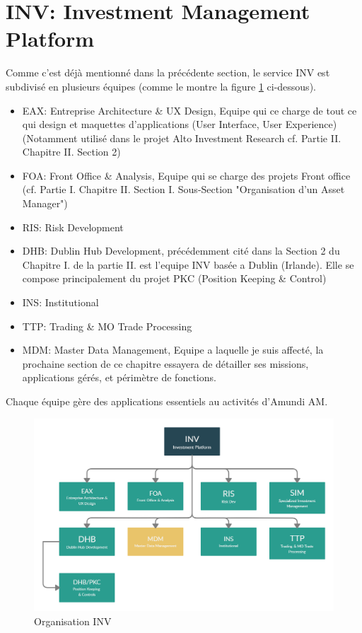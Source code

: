 \section{INV: Investment Management Platform}
\par Comme c'est déjà mentionné dans la précédente section, le service INV est subdivisé en plusieurs équipes (comme le montre la figure \ref{fig:inv} ci-dessous).\\
\begin{itemize}
    \item EAX: Entreprise Architecture \& UX Design, Equipe qui ce charge de tout ce qui design et maquettes d'applications (User Interface, User Experience) (Notamment utilisé dans le projet Alto Investment Research cf. Partie II. Chapitre II. Section 2) 
    \item FOA: Front Office \& Analysis, Equipe qui se charge des projets Front office (cf. Partie I. Chapitre II. Section I. Sous-Section "Organisation d'un Asset Manager")
    \item RIS: Risk Development
    \item DHB: Dublin Hub Development, précédemment cité dans la Section 2 du Chapitre I. de la partie II. est l'equipe INV basée a Dublin (Irlande). Elle se compose principalement du projet PKC (Position Keeping \& Control) 
    \item INS: Institutional 
    \item TTP: Trading \& MO Trade Processing 
    \item MDM: Master Data Management, Equipe a laquelle je suis affecté, la prochaine section de ce chapitre essayera de détailler ses missions, applications gérés, et périmètre de fonctions.
\end{itemize}
\par Chaque équipe gère des applications essentiels au activités d'Amundi AM.
\begin{figure}[ht]
    \includegraphics[width=\columnwidth]{img/Org INV.png}
    \caption{Organisation INV}
    \label{fig:inv}
\end{figure}

